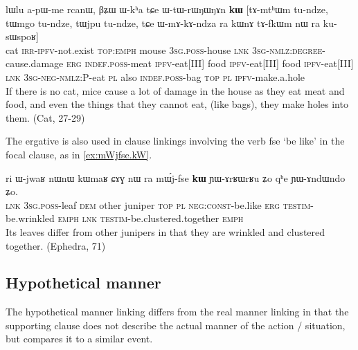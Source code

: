 \documentclass[oldfontcommands,oneside,a4paper,11pt]{article}
\newcommand{\ipa}[1]{{\phon \mbox{#1}}} %
\begin{document}
\begin{exe}
\ex \label{ex:WtWrWNWNAn}
\gll
\ipa{lɯlu}         	\ipa{a-pɯ-me}         	\ipa{rcanɯ,}         	\ipa{βʑɯ}         	\ipa{ɯ-kʰa}         	\ipa{tɕe}         	\ipa{ɯ-tɯ-rɯŋɯŋɤn}         	\ipa{\textbf{kɯ}}          [\ipa{tɤ-mtʰɯm}         	\ipa{tu-ndze,}         	\ipa{tɯmgo}         	\ipa{tu-ndze,}         	\ipa{tɯjpu}         	\ipa{tu-ndze,}         \ipa{tɕe}         	\ipa{ɯ-mɤ-kɤ-ndza}         	\ipa{ra}         	\ipa{kɯnɤ}         	\ipa{tɤ-fkɯm}         	\ipa{nɯ} \ipa{ra}         	\ipa{ku-sɯspoʁ}]         \\
cat \textsc{irr-ipfv}-not.exist \textsc{top:emph} mouse \textsc{3sg.poss}-house \textsc{lnk} \textsc{3sg-nmlz:degree}-cause.damage \textsc{erg} \textsc{indef.poss}-meat \textsc{ipfv}-eat[III] food \textsc{ipfv}-eat[III] food \textsc{ipfv}-eat[III]  \textsc{lnk} \textsc{3sg-neg-nmlz:P}-eat \textsc{pl} also \textsc{indef.poss}-bag \textsc{top} \textsc{pl} \textsc{ipfv}-make.a.hole \\
\glt  If there is no cat, mice cause a lot of damage in the house as they eat meat and food, and even the things that they cannot eat, (like bags), they make holes into them. (Cat, 27-29)
\end{exe}
 
 
 The ergative is also used in clause linkings involving the verb \ipa{fse} `be like' in the focal clause, as in \ref{ex:mWjfse.kW}.
 
 \begin{exe}
\ex \label{ex:mWjfse.kW}
\gll
\ipa{ri} 	\ipa{ɯ-jwaʁ} 	\ipa{nɯnɯ} 	\ipa{kɯmaʁ} 	\ipa{ɕɤɣ} 	\ipa{nɯ} \ipa{ra} 	\ipa{mɯ́j-fse} 	\ipa{\textbf{kɯ}} 	\ipa{ɲɯ-ɤrʁɯrʁu} 	\ipa{ʑo} 	\ipa{qʰe} 	\ipa{ɲɯ-ɤndɯndo} 	\ipa{ʑo.} \\
\textsc{lnk} \textsc{3sg.poss}-leaf \textsc{dem} other juniper \textsc{top} \textsc{pl} \textsc{neg:const}-be.like \textsc{erg} \textsc{testim}-be.wrinkled \textsc{emph} \textsc{lnk}  \textsc{testim}-be.clustered.together \textsc{emph} \\
\glt Its leaves differ from other junipers in that they are wrinkled and clustered together. (Ephedra, 71)
 \end{exe}
 
\subsection{Hypothetical manner}
The hypothetical manner linking differs from the real manner linking in that the supporting clause does not describe the actual manner of the action / situation, but compares it to a similar event. 
\end{document}
